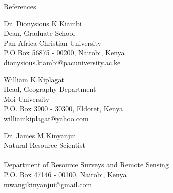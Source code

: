 \documentclass{resume} %
\begin{document}


\begin{rSection}{References}
\begin{esSubsection}
{Dr. Dionysious K Kiambi}\\
{Dean, Graduate School}\\
{Pan Africa Christian University}\\
{P.O Box 56875 - 00200, Nairobi, Kenya}\\
{dionysious.kiambi@pacuniversity.ac.ke}
\end{esSubsection}

\begin{esSubsection}
{William  K.Kiplagat}\\
{Head, Geography Department}\\
{Moi University}\\
{P.O. Box 3900 - 30300, Eldoret, Kenya}\\
{williamkiplagat@yahoo.com}
\end{esSubsection}

\begin{esSubsection}
{Dr. James M Kinyanjui}\\
{Natural Resource Scientist}\\
{}\\
{Department of Resource Surveys and Remote Sensing}\\
{P.O. Box 47146 - 00100, Nairobi, Kenya}\\
{mwangikinyanjui@gmail.com}
\end{esSubsection}

\end{rSection}
\end{document}
